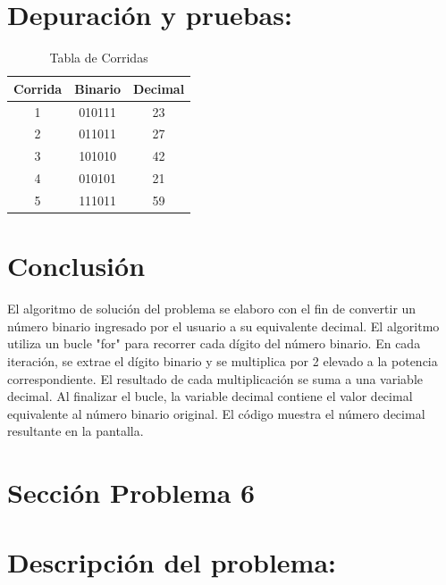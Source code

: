 \documentclass{IEEEcsmag}
\begin{document}
\section*{Depuración y pruebas:}
 
 \begin{table}[h]
     \centering
     \caption{Tabla de Corridas}
     
     \begin{tabular}{|c|c|c|}
     \hline
        Corrida & Binario & Decimal\\
        \hline
        1  & 010111 & 23\\
        \hline
        2  & 011011 & 27\\
        \hline
        3  & 101010 & 42\\
        \hline
        4  & 010101 & 21\\
        \hline
        5  & 111011 & 59\\
        \hline
     \end{tabular}
     \label{tab:my_label}
 \end{table}

\section*{Conclusión}
El algoritmo de solución del problema se elaboro con el fin de convertir un número binario ingresado por el usuario a su equivalente decimal. El algoritmo utiliza un bucle "for" para recorrer cada dígito del número binario. En cada iteración, se extrae el dígito binario y se multiplica por 2 elevado a la potencia correspondiente. El resultado de cada multiplicación se suma a una variable decimal. Al finalizar el bucle, la variable decimal contiene el valor decimal equivalente al número binario original. El código muestra el número decimal resultante en la pantalla.
\clearpage










\section{Sección Problema 6}
\section*{Descripción del problema:}
\end{document}
